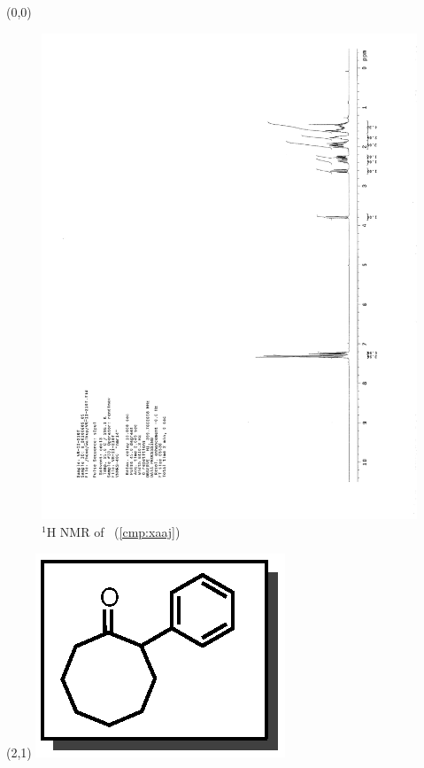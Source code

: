 \begin{textblock}{20}(0,0)
\begin{figure}[htb]
\caption{$^1$H NMR of \CMPxaaj\ (\ref{cmp:xaaj})}
\includegraphics[scale=0.75, trim = 0mm 0mm 0mm 5mm,
clip]{chp_asymmetric/images/nmr/xaajH}
\vspace{-100pt}
\end{figure}
\end{textblock}
\begin{textblock}{1}(2,1)
\includegraphics[scale=0.8, angle=90]{chp_asymmetric/images/xaaj}
\end{textblock}
